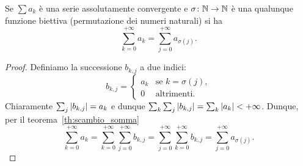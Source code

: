 \begin{theorem}%
\label{th:convergenza_incondizionata}%
\mymark{*}%
%
Se $\sum a_k$ è una serie assolutamente convergente e $\sigma\colon {\mathbb N} \to {\mathbb N}$
è una qualunque funzione biettiva (permutazione dei numeri naturali)
si ha
\[
  \sum_{k=0}^{+\infty} a_k
  = \sum_{j=0}^{+\infty} a_{\sigma(j)}.
\]
\end{theorem}
\begin{proof}
Definiamo la successione $b_{k,j}$ a due indici:
\[
  b_{k,j} = \begin{cases}
    a_k & \text{se $k=\sigma(j)$},\\
    0 & \text{altrimenti}.
  \end{cases}  
\] 
Chiaramente $\sum_j {\left|b_{k,j}\right|} = a_k$
e dunque $\sum_k \sum_j {\left|b_{k,j}\right|} = \sum_k {\left|a_k\right|} < +\infty$.
Dunque, per il teorema~\ref{th:scambio_somma}
\[
 \sum_{k=0}^{+\infty} a_k 
 = \sum_{k=0}^{+\infty} \sum_{j=0}^{+\infty}b_{k,j}
 = \sum_{j=0}^{+\infty} \sum_{k=0}^{+\infty}b_{k,j}
 = \sum_{j=0}^{+\infty} a_{\sigma(j)}.  
\]
\end{proof}

